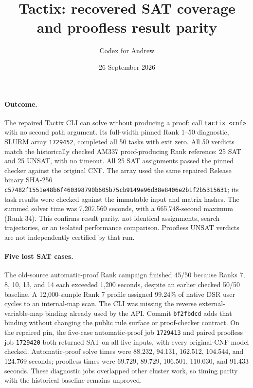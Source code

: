 \documentclass[11pt]{article}
\title{Tactix: recovered SAT coverage and proofless result parity}
\author{Codex for Andrew}
\date{26 September 2026}
\begin{document}
\maketitle

\paragraph{Outcome.}
The repaired Tactix CLI can solve without producing a proof: call
\texttt{tactix <cnf>} with no second path argument. Its full-width pinned
Rank 1--50 diagnostic, SLURM array \texttt{1729452}, completed all 50 tasks
with exit zero. All 50 verdicts match the historically checked AM337
proof-producing Rank reference: 25 SAT and 25 UNSAT, with no timeout. All 25 SAT assignments passed
the pinned checker against the original CNF. The array used the same repaired
Release binary SHA-256 \texttt{c57482f1551e48b6f460398790b605b75cb9149e96d38e8406e2b1f2b5315631};
its task results were checked against the immutable input and matrix hashes.
The summed solver time was 7,207.560 seconds, with a 665.748-second maximum
(Rank 34). This confirms result parity, not identical assignments, search
trajectories, or an isolated performance comparison. Proofless UNSAT verdicts
are not independently certified by that run.

\paragraph{Five lost SAT cases.}
The old-source automatic-proof Rank campaign finished 45/50 because Ranks
7, 8, 10, 13, and 14 each exceeded 1,200 seconds, despite an earlier checked
50/50 baseline. A 12,000-sample Rank 7 profile assigned 99.24\% of native
DSR user cycles to an internal-map scan. The CLI was missing the reverse
external-variable-map binding already used by the API. Commit
\texttt{bf2fbdcd} adds that binding without changing the public rule surface
or proof-checker contract. On the repaired pin, the five-case automatic-proof
job \texttt{1729413} and paired proofless job \texttt{1729420} both returned
SAT on all five inputs, with every original-CNF model checked. Automatic-proof
solve times were 88.232, 94.131, 162.512, 104.544, and 124.769 seconds;
proofless times were 69.729, 89.729, 106.501, 110.030, and 91.433 seconds.
These diagnostic jobs overlapped other cluster work, so timing parity with
the historical baseline remains unproved.
\end{document}
